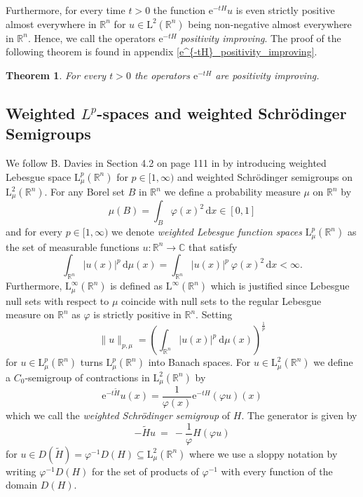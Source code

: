 \documentclass[12pt,longbibliography]{article}
\def\C{\mathbb{C}}
\def\R{\mathbb{R}}
\def\d{\,\mathrm{d}}
\newtheorem{thm}{Theorem}[section]
\theoremstyle{definition}
\theoremstyle{remark}
\theoremstyle{example}
\begin{document}
Furthermore, for every time $t > 0$ the function $\mathrm{e}^{-tH}u$ is even strictly positive 
almost everywhere in $\R^{n}$ for $u \in \mathrm{L}^{2}(\R^{n})$ being non-negative almost everywhere in $\R^{n}$. 
Hence, we call the operators $\mathrm{e}^{-tH}$ \textit{positivity improving}. The proof of the following theorem 
is found in appendix \ref{e^{-tH}_positivity_improving}.\\

\begin{thm}
For every $t>0$ the operators $\mathrm{e}^{-tH}$ are positivity improving.\\
\end{thm}



\subsection{Weighted $L^{p}$-spaces and weighted Schrödinger Semigroups}

We follow B. Davies in Section 4.2 on page 111 in \cite{Davies07} by introducing weighted Lebesgue 
space $\mathrm{L}^{p}_{\mu}(\R^{n})$ for $p \in [1,\infty)$ and weighted Schrödinger semigroups 
on $\mathrm{L}^{2}_{\mu}(\R^{n})$. For any Borel set $B$ in $\R^{n}$ we define a probability measure 
$\mu$ on $\R^{n}$ by 
$$
\mu (B) = \int_{B} \varphi (x)^{2} \d x \in [0,1]
$$
and for every $p \in [1,\infty)$ we denote \textit{weighted Lebesgue function spaces} $\mathrm{L}_{\mu}^{p}(\R^{n})$ 
as the set of measurable functions $u \colon \R^{n} \to \C$ that satisfy
$$
\int_{\R^{n}} |u(x)|^{p} \d \mu(x) = 
\int_{\R^{n}} |u(x)|^{p} \ \varphi (x)^{2} \d x < \infty.
$$ 
Furthermore, $\mathrm{L}_{\mu}^{\infty}(\R^{n})$ is defined as $\mathrm{L}^{\infty}(\R^{n})$ which is justified since 
Lebesgue null sets with respect to $\mu$ coincide with null sets to the regular Lebesgue measure on $\R^{n}$ 
as $\varphi$ is strictly positive in $\R^{n}$. Setting
$$
\| u \|_{p, \mu} = \left( \int_{\R^{n}} |u(x)|^{p} \ \mathrm{d}\mu(x) \right)^{\frac{1}{p}}
$$
for $u \in \mathrm{L}_{\mu}^{p}(\R^{n})$ turns $\mathrm{L}_{\mu}^{p}(\R^{n})$ into Banach spaces. For 
$u \in \mathrm{L}^{2}_{\mu}(\R^{n})$ we define a $C_{0}$-semigroup of contractions in $\mathrm{L}^{2}_{\mu}(\R^{n})$ by
\begin{equation}
\mathrm{e}^{-t\tilde{H}}u (x)  = \frac{1}{\varphi(x)}\mathrm{e}^{-tH}(\varphi u) (x)
\end{equation}
which we call the \textit{weighted Schrödinger semigroup} of $H$. The generator is given by 
\begin{equation}
-\tilde{H}u \ = \ - \frac{1}{\varphi} H (\varphi u) 
\end{equation} 
for $u \in D( \tilde{H}) = \varphi^{-1} D\left( H \right) \subseteq \mathrm{L}^{2}_{\mu}(\R^{n})$ where we use a sloppy
notation by writing $\varphi^{-1} D\left( H \right)$ for the set of products of $\varphi^{-1}$ with every function of 
the domain $D\left( H \right)$.\\
\end{document}
